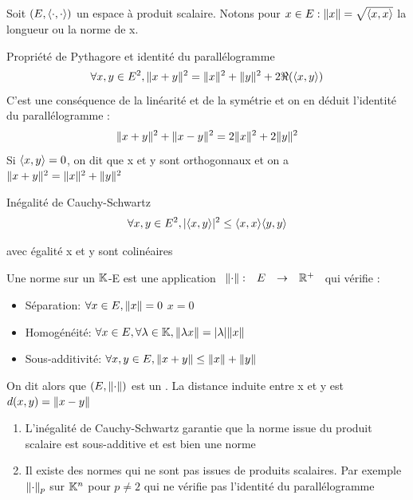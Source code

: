 \documentclass[]{report}
\begin{document}
    \begin{re}{}{}
        Soit $(E,\langle \cdot,\cdot \rangle)$ un espace à produit scalaire. Notons pour $x\in E : \lVert x \rVert=\sqrt{\langle x,x \rangle}$ la longueur ou la norme de x.
    \end{re}

    \begin{prop}{Propriété de Pythagore et identité du parallélogramme}{}
        \[\forall x,y\in E^2,\lVert x+y \rVert^2=\lVert x \rVert^2+\lVert y \rVert^2+2\Re (\langle x,y \rangle)\]
        C'est une conséquence de la linéarité et de la symétrie et on en déduit l'identité du parallélogramme :
        \[\lVert x+y \rVert^2+\lVert x-y \rVert^2=2\lVert x \rVert^2+2\lVert y \rVert^2\]
        Si $\langle x,y \rangle=0$, on dit que x et y sont orthogonnaux et on a $\lVert x+y \rVert^2=\lVert x \rVert^2+\lVert y \rVert^2$
    \end{prop}

    \begin{prop}{Inégalité de Cauchy-Schwartz}{}
        \[\forall x,y\in E^2, |\langle x,y \rangle|^2\le \langle x,x \rangle\langle y,y \rangle\]
        \begin{center}
            avec égalité \ssi x et y sont colinéaires
        \end{center}
    \end{prop}

    \begin{df}{}{}
        Une norme sur un $\mathbb{K}$-\ev E est une application $\begin{array}{ccccc} \lVert \cdot \rVert : & E & \to & \mathbb{R}^+ \end{array}$ qui vérifie :
        \begin{itemize}
            \item Séparation: $\forall x\in E, \lVert x \rVert=0$ \ssi $x=0$
            \item Homogénéité: $\forall x \in E,\forall \lambda\in \mathbb{K}, \lVert \lambda x \rVert=|\lambda|\lVert x \rVert$
            \item Sous-additivité: $\forall x,y\in E, \lVert x+y \rVert\le \lVert x \rVert+\lVert y \rVert$
        \end{itemize}
        On dit alors que $(E,\lVert \cdot \rVert)$ est un \evn. La distance induite entre x et y est $d(x,y)=\lVert x-y \rVert$
    \end{df}

    \begin{ex}{}{}
        \begin{enumerate}
            \item L'inégalité de Cauchy-Schwartz garantie que la norme issue du produit scalaire est sous-additive et est bien une norme
            \item Il existe des normes qui ne sont pas issues de produits scalaires. Par exemple $\lVert \cdot \rVert_p$ sur $\mathbb{K}^n$ pour $p\neq 2$ qui ne vérifie pas l'identité du parallélogramme
        \end{enumerate}
    \end{ex}
\end{document}
